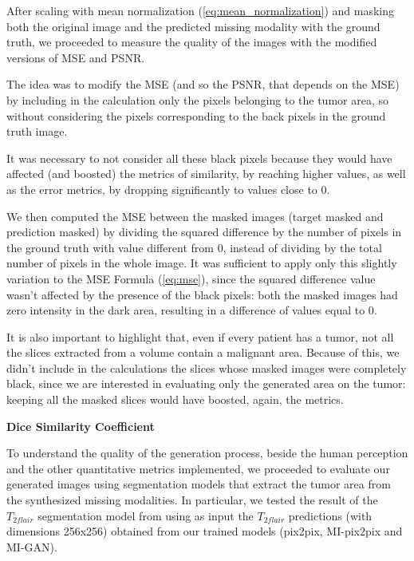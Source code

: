 After scaling with mean normalization (\ref{eq:mean_normalization}) and masking both the original image and the predicted missing modality with the ground truth, we proceeded to measure the quality of the images with the modified versions of MSE and PSNR.

\vspace{5mm} %
The idea was to modify the MSE (and so the PSNR, that depends on the MSE) by including in the calculation only the pixels belonging to the tumor area, so without considering the pixels corresponding to the back pixels in the ground truth image.

It was necessary to not consider all these black pixels because they would have affected (and boosted) the metrics of similarity, by reaching higher values, as well as the error metrics, by dropping significantly to values close to 0.

We then computed the MSE between the masked images (target masked and prediction masked) by dividing the squared difference by the number of pixels in the ground truth with value different from 0, instead of dividing by the total number of pixels in the whole image. It was sufficient to apply only this slightly variation to the MSE Formula (\ref{eq:mse}), since the squared difference value wasn't affected by the presence of the black pixels: both the masked images had zero intensity in the dark area, resulting in a difference of values equal to 0.

\vspace{5mm} %
It is also important to highlight that, even if every patient has a tumor, not all the slices extracted from a volume contain a malignant area. Because of this, we didn't include in the calculations the slices whose masked images were completely black, since we are interested in evaluating only the generated area on the tumor: keeping all the masked slices would have boosted, again, the metrics.

\vspace{6mm} 
\noindent\textbf{Dice Similarity Coefficient}

\vspace{2mm}
\noindent To understand the quality of the generation process, beside the human perception and the other quantitative metrics implemented, we proceeded to evaluate our generated images using segmentation models that extract the tumor area from the synthesized missing modalities. 
In particular, we tested the result of the $T_{2flair}$ segmentation model from \cite{giacomello2019brain} using as input the $T_{2flair}$ predictions (with dimensions 256x256) obtained from our trained models (pix2pix, MI-pix2pix and MI-GAN).

